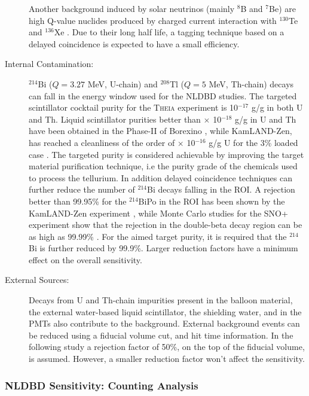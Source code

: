 \begin{description}
Another background induced by solar neutrinos (mainly $^{8}$B and $^{7}$Be) are high Q-value nuclides produced by charged current interaction with $^{130}$Te and $^{136}$Xe \cite{eijiri14, eijiri17}. Due to their long half life, a tagging technique based on a delayed coincidence is expected to have a small efficiency. 
\item[Internal Contamination:] $^{214}$Bi ($Q=3.27$ MeV, U-chain) and $^{208}$Tl ($Q=5$ MeV, Th-chain) decays can fall in the energy window used for the NLDBD studies. The targeted scintillator cocktail purity for the \textsc{Theia} experiment is 10$^{-17}$ g/g in both U and Th. Liquid scintillator purities better than $\times$ 10$^{-18}$ g/g in U and Th have been obtained in the Phase-II of Borexino \cite{bxo16}, while KamLAND-Zen, has reached a cleanliness of the order of $\times$ 10$^{-16}$ g/g U for the 3\% loaded case \cite{gando13}. The targeted purity is considered achievable by improving the target material purification technique, i.e the purity grade of the chemicals used to process the tellurium. In addition delayed coincidence techniques can further reduce the number of $^{214}$Bi decays falling in the ROI. A rejection better than 99.95\% for the $^{214}$BiPo in the ROI has been shown by the KamLAND-Zen experiment \cite{KD-Zen}, while Monte Carlo studies for the SNO+ experiment show that the rejection in the double-beta decay region can be as high as 99.99\% \cite{snop16}. For the aimed target purity, it is required that the $^{214}$Bi is further reduced by 99.9\%. Larger reduction factors have a minimum effect on the overall sensitivity.
\item[External Sources:] Decays from U and Th-chain impurities present in the balloon material, the external water-based liquid scintillator, the
shielding water, and in the PMTs also contribute to the background. External background events can be reduced using a fiducial volume cut, and hit time information. In the following study a rejection factor of 50\%, on the top of the fiducial volume, is assumed. However, a smaller reduction factor won't affect the sensitivity.
\end{description}

\subsubsection{NLDBD Sensitivity: Counting Analysis}\label{sec::sensitivity}

